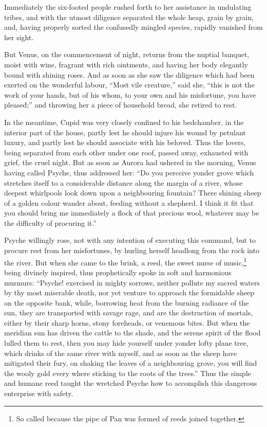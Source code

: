 \documentclass[12pt]{article}
\begin{document}
Immediately the six-footed people rushed forth to her assistance in undulating
tribes, and with the utmost diligence separated the whole heap, grain by grain,
and, having properly sorted the confusedly mingled species, rapidly vanished
from her sight.

But Venus, on the commencement of night, returns from the nuptial banquet,
moist with wine, fragrant with rich ointments, and having her body elegantly
bound with shining roses. And as soon as she saw the diligence which had been
exerted on the wonderful labour, ``Most vile creature,'' said she, ``this is
not the work of your hands, but of his whom, to your own and his misfortune,
you have pleased;'' and throwing her a piece of household bread, she retired to
rest.

In the meantime, Cupid was very closely confined to his bedchamber, in the
interior part of the house, partly lest he should injure his wound by petulant
luxury, and partly lest he should associate with his beloved. Thus the lovers,
being separated from each other under one roof, passed away, exhausted with
grief, the cruel night. But as soon as Aurora had ushered in the morning, Venus
having called Psyche, thus addressed her: ``Do you perceive yonder grove which
stretches itself to a considerable distance along the margin of a river, whose
deepest whirlpools look down upon a neighbouring fountain? There shining sheep
of a golden colour wander about, feeding without a shepherd. I think it fit
that you should bring me immediately a flock of that precious wool, whatever
may be the difficulty of procuring it.''

Psyche willingly rose, not with any intention of executing this command, but to
procure rest from her misfortunes, by hurling herself headlong from the rock
into the river. But when she came to the brink, a reed, the sweet nurse of
music,\footnote{So called because the pipe of Pan was formed of reeds joined
together.} being divinely inspired, thus prophetically spoke in soft and
harmonious murmurs: ``Psyche! exercised in mighty sorrows, neither pollute my
sacred waters by thy most miserable death, nor yet venture to approach the
formidable sheep on the opposite bank, while, borrowing heat from the burning
radiance of the sun, they are transported with savage rage, and are the
destruction of mortals, either by their sharp horns, stony foreheads, or
venemous bites. But when the meridian sun has driven the cattle to the shade,
and the serene spirit of the flood lulled them to rest, then you may hide
yourself under yonder lofty plane tree, which drinks of the same river with
myself, and as soon as the sheep have mitigated their fury, on shaking the
leaves of a neighbouring grove, you will find the wooly gold every where
sticking to the roots of the trees.'' Thus the simple and humane reed taught
the wretched Psyche how to accomplish this dangerous enterprise with safety.
\end{document}
